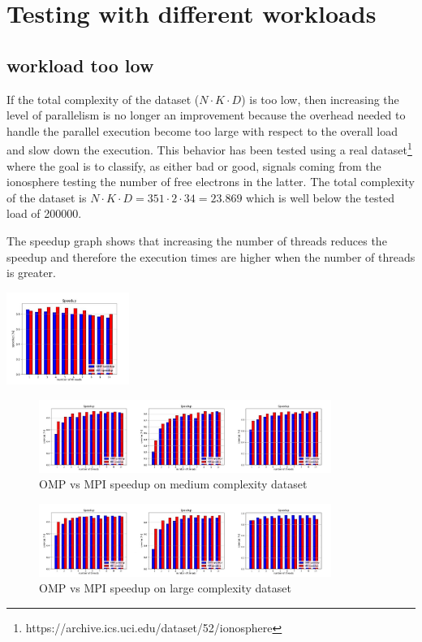 \documentclass[conference]{IEEEtran}
\begin{document}
\section{Testing with different workloads\label{sec:diff_loads}}
\subsection{workload too low}
If the total complexity of the dataset ($N\cdot K\cdot D$) is too low, then increasing the level of parallelism is no longer an improvement because the overhead needed to handle the parallel execution become too large with respect to the overall load and slow down the execution. This behavior has been tested using a real dataset\footnote{https://archive.ics.uci.edu/dataset/52/ionosphere} where the goal is to classify, as either bad or good, signals coming from the ionosphere testing the number of free electrons in the latter. The total complexity of the dataset is $N\cdot K\cdot D = 351 \cdot 2\cdot 34 = 23.869$ which is well below the tested load of 200000.

The speedup graph shows that increasing the number of threads reduces the speedup and therefore the execution times are higher when the number of threads is greater.
\centerline{\includegraphics[width = 0.3\textwidth]{imgs/suiono.jpg}}

\begin{figure}
  \centering
  \caption{OMP vs MPI speedup on medium complexity dataset}
  \label{fig:su_res}
  \includegraphics[width = 0.85\textwidth]{imgs/sumedpts.jpg}
\end{figure}
\begin{figure}
  \centering
  \caption{OMP vs MPI speedup on large complexity dataset}
  \label{fig:suslow}
  \includegraphics[width = 0.85\textwidth]{imgs/suhghpts.jpg}
\end{figure}
\end{document}
